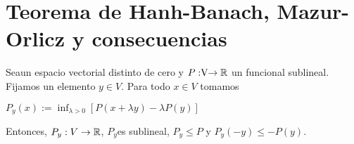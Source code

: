 \chapter*{Teorema de Hanh-Banach, Mazur-Orlicz y consecuencias}
	\thispagestyle{empty}
	
	\begin{lemaBox}\label{lema1}
		Sea\vecSpace un espacio vectorial distinto de cero y $P:\vecSpace \rightarrow \RR$ un funcional sublineal. Fijamos un elemento $ y \in V $. Para todo $ x \in V $ tomamos  
		\begin{center}
			$ P_y(x) := \inf_{\lambda > 0} \left[P(x+\lambda y) - \lambda P(y)\right] $
		\end{center}
		
		Entonces, $ P_y:V \rightarrow \mathbb{R}$, $ P_y $es sublineal, $ P_y \leq P $ y $ P_y (-y) \leq  -P(y)$.
	\end{lemaBox} 
